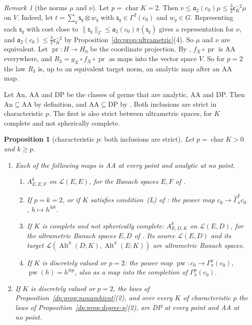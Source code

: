\documentclass[11pt]{amsart}
\newtheorem{proposition}[theorem]{Proposition}
\theoremstyle{definition}
\theoremstyle{remark}
\newtheorem{remark}[theorem]{Remark}
\numberwithin{equation}{section}
\newcommand{\cL}{\mathcal L}
\newcommand{\Alt}{\operatorname{Alt}}
\newcommand{\norm}[1]{\lVert #1\rVert}
\theoremstyle{plain}
\theoremstyle{definition}
\theoremstyle{plain}
\newcommand{\hGamma}{\widehat\Gamma}
\begin{document}
\begin{remark}[the norms $\mu$ and $\nu$]\label{dp:rem:nu-mu}
Let $p=\operatorname{char}K=2$. Then $\nu\le\mathfrak a_2(c_0)\mu\le\frac32\mathfrak c_K^{-2}\mu$ on $V$. Indeed, let $t=\sum_q\mathsf s_q\otimes w_q$ with $\mathsf s_q\in\Gamma^2(c_0)$ and $w_q\in G$. Representing each $\mathsf s_q$ with cost close to $\norm{\mathsf s_q}_\Gamma\le\mathfrak a_2(c_0)\pi(\mathsf s_q)$ gives a representation for $\nu$, and $\mathfrak a_2(c_0)\le\frac32\mathfrak c_K^{-2}$ by Proposition~\ref{dp:prop:ultrametric}(4). So $\mu$ and $\nu$ are equivalent. Let $\operatorname{pr}\colon H\to H_0$ be the coordinate projection. By \cite[Proposition~14.12(1)(b)]{I}, $f_X\circ\operatorname{pr}$ is AA everywhere, and $R_3=g_X\circ f_X\circ\operatorname{pr}$ as maps into the vector space $V$. So for $p=2$ the law $R_3$ is, up to an equivalent target norm, an analytic map after an AA map.
\end{remark}

Let $\mathrm{An}$, $\mathrm{AA}$ and $\mathrm{DP}$ be the classes of germs that are analytic, AA and DP. Then $\mathrm{An}\subseteq\mathrm{AA}$ by definition, and $\mathrm{AA}\subseteq\mathrm{DP}$ by \cite[Proposition~14.9(1)]{I}. Both inclusions are strict in characteristic $p$. The first is also strict between ultrametric spaces, for $K$ complete and not spherically complete.

\begin{proposition}[characteristic $p$: both inclusions are strict]\label{dp:prop:strict}
Let $p=\operatorname{char}K>0$ and $k\ge p$.
\begin{enumerate}
\item Each of the following maps is AA at every point and analytic at no point.
\begin{enumerate}
\item $A^k_{E,E;F}$ on $\cL(E,E)$, for the Banach spaces $E,F$ of \cite[Theorem~7.2(1)]{I}.
\item If $p=k=2$, or if $K$ satisfies condition~\textup{(L)} of \cite[Section~7.1]{I}: the power map $c_0\to\hGamma^k_\pi c_0$, $h\mapsto h^{\otimes k}$.
\item If $K$ is complete and not spherically complete: $A^k_{E,D;K}$ on $\cL(E,D)$, for the ultrametric Banach spaces $E,D$ of \cite[Theorem~7.2(2)]{I}. Its source $\cL(E,D)$ and its target $\cL(\Alt^k(D;K),\Alt^k(E;K))$ are ultrametric Banach spaces.
\item If $K$ is discretely valued or $p=2$: the power map $\operatorname{pw}\colon c_0\to\Gamma^p_\pi(c_0)$, $\operatorname{pw}(h)=h^{\otimes p}$, also as a map into the completion of $\Gamma^p_\pi(c_0)$.
\end{enumerate}
\item If $K$ is discretely valued or $p=2$, the laws of Proposition~\ref{dp:prop:nonambient}(2), and over every $K$ of characteristic $p$ the laws of Proposition~\ref{dp:prop:degree-p}(2), are DP at every point and AA at no point.
\end{enumerate}
\end{proposition}
\end{document}
